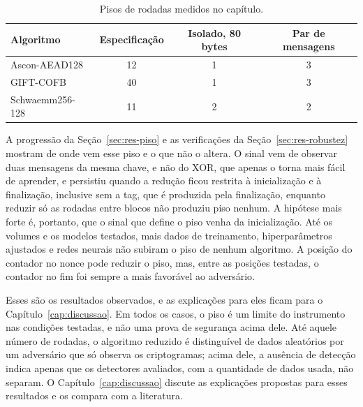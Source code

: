 \begin{table}[htb]
\centering
\caption{Pisos de rodadas medidos no capítulo.}
\label{tab:res-sintese}
\footnotesize
\setlength{\tabcolsep}{4pt}
\begin{tabular}{lccc}
\toprule
Algoritmo & Especificação & Isolado, 80 bytes & Par de mensagens \\
\midrule
Ascon-AEAD128   & 12 & 1 & 3 \\
GIFT-COFB       & 40 & 1 & 3 \\
Schwaemm256-128 & 11 & 2 & 2 \\
\bottomrule
\end{tabular}
\end{table}

A progressão da Seção~\ref{sec:res-piso} e as verificações da Seção~\ref{sec:res-robustez} mostram de onde vem esse piso e o que não o altera. O sinal vem de observar duas mensagens da mesma chave, e não do XOR, que apenas o torna mais fácil de aprender, e persistiu quando a redução ficou restrita à inicialização e à finalização, inclusive sem a tag, que é produzida pela finalização, enquanto reduzir só as rodadas entre blocos não produziu piso nenhum. A hipótese mais forte é, portanto, que o sinal que define o piso venha da inicialização. Até os volumes e os modelos testados, mais dados de treinamento, hiperparâmetros ajustados e redes neurais não subiram o piso de nenhum algoritmo. A posição do contador no nonce pode reduzir o piso, mas, entre as posições testadas, o contador no fim foi sempre a mais favorável ao adversário.

Esses são os resultados observados, e as explicações para eles ficam para o Capítulo~\ref{cap:discussao}. Em todos os casos, o piso é um limite do instrumento nas condições testadas, e não uma prova de segurança acima dele. Até aquele número de rodadas, o algoritmo reduzido é distinguível de dados aleatórios por um adversário que só observa os criptogramas; acima dele, a ausência de detecção indica apenas que os detectores avaliados, com a quantidade de dados usada, não separam. O Capítulo~\ref{cap:discussao} discute as explicações propostas para esses resultados e os compara com a literatura.
